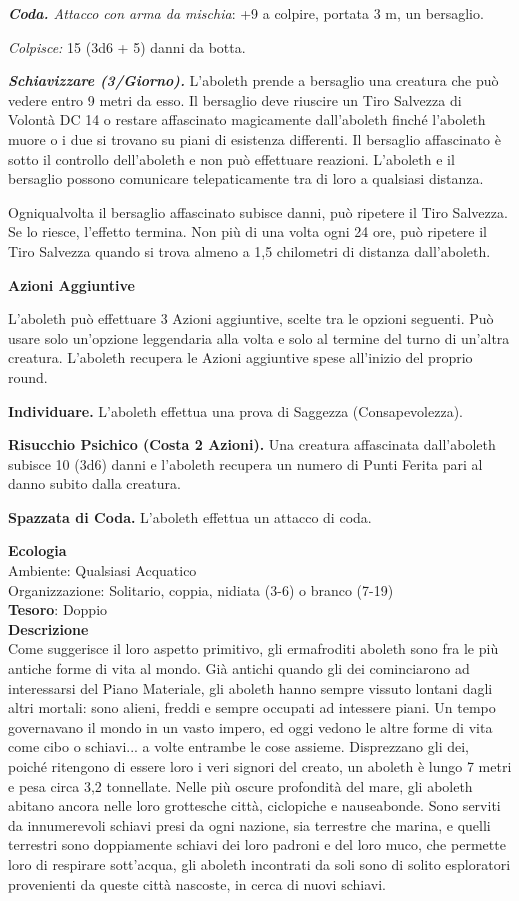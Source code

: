 \begin{multicols}{2}
	\textit{\textbf{Coda.} Attacco con arma da mischia}: +9 a colpire, portata 3 m, un bersaglio.

	\textit{Colpisce:} 15 (3d6 + 5) danni da botta.

	\textit{\textbf{Schiavizzare (3/Giorno).}} L'aboleth prende a bersaglio una creatura che può vedere entro 9 metri da esso. Il bersaglio deve riuscire un Tiro Salvezza di Volontà DC 14 o restare affascinato magicamente dall'aboleth finché l'aboleth muore o i due si trovano su piani di esistenza differenti. Il bersaglio affascinato è sotto il controllo dell'aboleth e non può effettuare reazioni. L'aboleth e il bersaglio possono comunicare telepaticamente tra di loro a qualsiasi distanza.

	Ogniqualvolta il bersaglio affascinato subisce danni, può ripetere il Tiro Salvezza. Se lo riesce, l'effetto termina. Non più di una volta ogni 24 ore, può ripetere il Tiro Salvezza quando si trova almeno a 1,5 chilometri di distanza dall'aboleth.

	\textbf{Azioni Aggiuntive}

	L'aboleth può effettuare 3 Azioni aggiuntive, scelte tra le opzioni seguenti. Può usare solo un'opzione leggendaria alla volta e solo al termine del turno di un'altra creatura. L'aboleth recupera le Azioni aggiuntive spese all'inizio del proprio round.

	\textbf{Individuare.} L'aboleth effettua una prova di Saggezza (Consapevolezza).

	\textbf{Risucchio Psichico (Costa 2 Azioni).} Una creatura affascinata dall'aboleth subisce 10 (3d6) danni e l'aboleth recupera un numero di Punti Ferita pari al danno subito dalla creatura.

	\textbf{Spazzata di Coda.} L'aboleth effettua un attacco di coda.

	\textbf{Ecologia}\\
	Ambiente: Qualsiasi Acquatico\\
	Organizzazione: Solitario, coppia, nidiata (3-6) o branco (7-19)\\
	\textbf{Tesoro}: Doppio\\
	\textbf{Descrizione}\\
	Come suggerisce il loro aspetto primitivo, gli ermafroditi aboleth sono fra le più antiche forme di vita al mondo. Già antichi quando gli dei cominciarono ad interessarsi del Piano Materiale, gli aboleth hanno sempre vissuto lontani dagli altri mortali: sono alieni, freddi e sempre occupati ad intessere piani. Un tempo governavano il mondo in un vasto impero, ed oggi vedono le altre forme di vita come cibo o schiavi... a volte entrambe le cose assieme. Disprezzano gli dei, poiché ritengono di essere loro i veri signori del creato, un aboleth è lungo 7 metri e pesa circa 3,2 tonnellate. Nelle più oscure profondità del mare, gli aboleth abitano ancora nelle loro grottesche città, ciclopiche e nauseabonde. Sono serviti da innumerevoli schiavi presi da ogni nazione, sia terrestre che marina, e quelli terrestri sono doppiamente schiavi dei loro padroni e del loro muco, che permette loro di respirare sott'acqua, gli aboleth incontrati da soli sono di solito esploratori provenienti da queste città nascoste, in cerca di nuovi schiavi.


\end{multicols}

